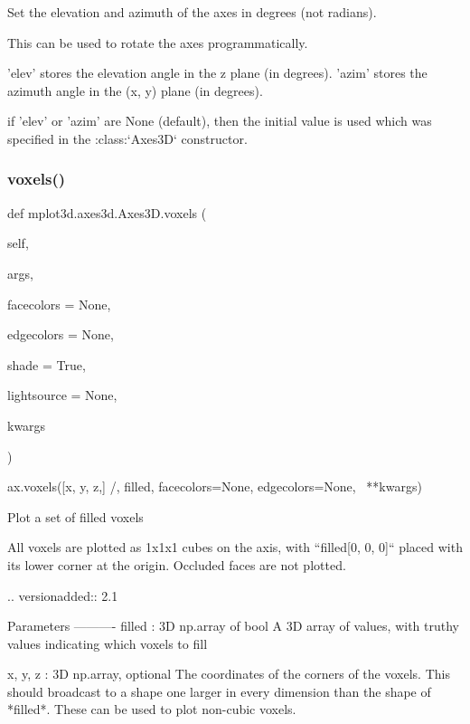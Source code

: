 \begin{DoxyVerb}
\begin{DoxyVerb}Set the elevation and azimuth of the axes in degrees (not radians).

This can be used to rotate the axes programmatically.

'elev' stores the elevation angle in the z plane (in degrees).
'azim' stores the azimuth angle in the (x, y) plane (in degrees).

if 'elev' or 'azim' are None (default), then the initial value
is used which was specified in the :class:`Axes3D` constructor.
\end{DoxyVerb}
 \mbox{\label{classmplot3d_1_1axes3d_1_1Axes3D_aa9ff1e641bb6ec66cf60f43149b74168}} 
\subsubsection{\texorpdfstring{voxels()}{voxels()}}
{\footnotesize\ttfamily def mplot3d.\+axes3d.\+Axes3\+D.\+voxels (\begin{DoxyParamCaption}\item[{}]{self,  }\item[{}]{args,  }\item[{}]{facecolors = {\ttfamily None},  }\item[{}]{edgecolors = {\ttfamily None},  }\item[{}]{shade = {\ttfamily True},  }\item[{}]{lightsource = {\ttfamily None},  }\item[{}]{kwargs }\end{DoxyParamCaption})}

\begin{DoxyVerb}ax.voxels([x, y, z,] /, filled, facecolors=None, edgecolors=None, \
**kwargs)

Plot a set of filled voxels

All voxels are plotted as 1x1x1 cubes on the axis, with
``filled[0, 0, 0]`` placed with its lower corner at the origin.
Occluded faces are not plotted.

.. versionadded:: 2.1

Parameters
----------
filled : 3D np.array of bool
    A 3D array of values, with truthy values indicating which voxels
    to fill

x, y, z : 3D np.array, optional
    The coordinates of the corners of the voxels. This should broadcast
    to a shape one larger in every dimension than the shape of
    *filled*.  These can be used to plot non-cubic voxels.


\end{DoxyVerb}
\end{DoxyVerb}

